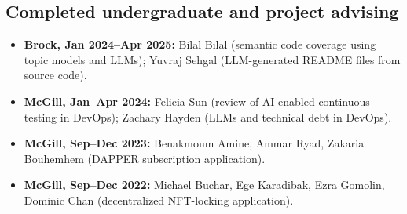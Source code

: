 \documentclass[10pt,letterpaper]{article}
\begin{document}
\subsection{Completed undergraduate and project advising}
\begin{itemize}
\item \textbf{Brock, Jan 2024--Apr 2025:} Bilal Bilal (semantic code coverage using topic models and LLMs); Yuvraj Sehgal (LLM-generated README files from source code).
\item \textbf{McGill, Jan--Apr 2024:} Felicia Sun (review of AI-enabled continuous testing in DevOps); Zachary Hayden (LLMs and technical debt in DevOps).
\item \textbf{McGill, Sep--Dec 2023:} Benakmoum Amine, Ammar Ryad, Zakaria Bouhemhem (DAPPER subscription application).
\item \textbf{McGill, Sep--Dec 2022:} Michael Buchar, Ege Karadibak, Ezra Gomolin, Dominic Chan (decentralized NFT-locking application).
\end{itemize}

\newpage
\end{document}
